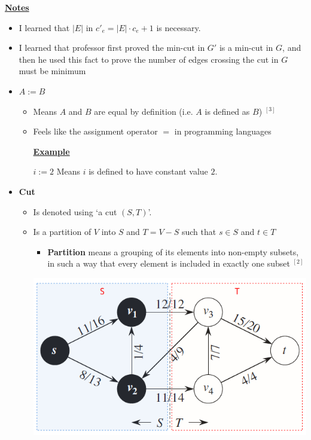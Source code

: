 \documentclass[12pt]{article}
\begin{document}
\begin{enumerate}[1.]

    \bigskip

    \underline{\textbf{Notes}}

    \bigskip

    \begin{itemize}
        \item I learned that $\lvert E \rvert$ in $c'_e = \lvert E \rvert \cdot c_e + 1$ is necessary.
        \item I learned that professor first proved the min-cut in $G'$ is a
        min-cut in $G$, and then he used this fact to prove the number of edges
        crossing the cut in $G$ must be minimum
        \item \textbf{$A := B$}

        \begin{itemize}
            \item Means $A$ and $B$ are equal by definition (i.e. $A$ is defined as $B$) $^{[3]}$
            \item Feels like the assignment operator $=$ in programming languages

            \bigskip

            \underline{\textbf{Example}}

            \bigskip

            $i := 2$ Means $i$ is defined to have constant value $2$.
        \end{itemize}

        \item \textbf{Cut}

        \begin{itemize}
            \item Is denoted using `a cut $(S,T)$'.
            \item Is a partition of $V$ into $S$ and $T = V - S$ such that $s \in S$ and
            $t \in T$

            \begin{itemize}
                \item \textbf{Partition }means a grouping of its elements into non-empty
                subsets, in such a way that every element is included in exactly one
                subset $^{[2]}$
            \end{itemize}

            \begin{center}
            \includegraphics[width=0.5\linewidth]{images/worksheet_5_solution_26.png}
            \end{center}
        \end{itemize}


\end{itemize}
\end{enumerate}
\end{document}
